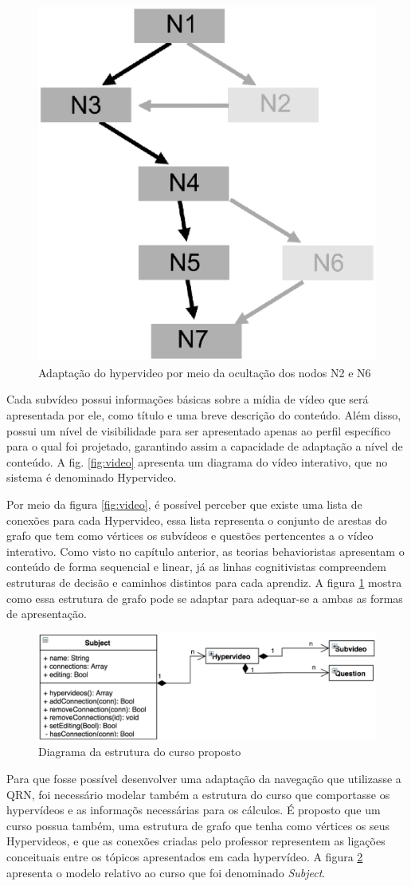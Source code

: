 \begin{figure}[h!]
	\centering
  	\includegraphics[width=.3\linewidth]{figuras/estrutura.eps}
  	\caption{Adaptação do hypervideo por meio da ocultação dos nodos N2 e N6}
  	\label{fig:estrutura}
\end{figure}

Cada subvídeo possui informações básicas sobre a mídia de vídeo que será apresentada por ele, como título e uma breve descrição do conteúdo. Além disso, possui um nível de visibilidade para ser apresentado apenas ao perfil específico para o qual foi projetado, garantindo assim a capacidade de adaptação a nível de conteúdo. A fig. \ref{fig:video} apresenta um diagrama do vídeo interativo, que no sistema é denominado Hypervideo.

Por meio da figura \ref{fig:video}, é possível perceber que existe uma lista de conexões para cada Hypervideo, essa lista representa o conjunto de arestas do grafo que tem como vértices os subvídeos e questões pertencentes a o vídeo interativo. Como visto no capítulo anterior, as teorias behavioristas apresentam o conteúdo de forma sequencial e linear, já as linhas cognitivistas compreendem estruturas de decisão e caminhos distintos para cada aprendiz. A figura \ref{fig:estrutura} mostra como essa estrutura de grafo pode se adaptar para adequar-se a ambas as formas de apresentação.

\begin{figure}[h!]
	\centering
  	\includegraphics[width=.7\linewidth]{figuras/curso.eps}
  	\caption{Diagrama da estrutura do curso proposto}
  	\label{fig:curso}
\end{figure}

Para que fosse possível desenvolver uma adaptação da navegação que utilizasse a QRN, foi necessário modelar também a estrutura do curso que comportasse os hypervídeos e as informaçõs necessárias para os cálculos. É proposto que um curso possua também, uma estrutura de grafo que tenha como vértices os seus Hypervideos, e que as conexões criadas pelo professor representem as ligações conceituais entre os tópicos apresentados em cada hypervídeo. A figura \ref{fig:curso} apresenta o modelo relativo ao curso que foi denominado \textit{Subject}.

